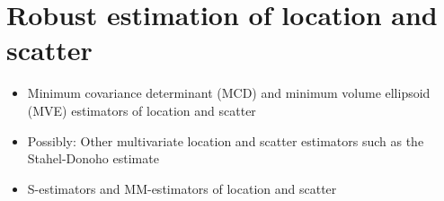 \chapter{Robust estimation of location and scatter}
\label{chap:mv}

\begin{itemize}
\item
    Minimum covariance determinant (MCD) and minimum volume ellipsoid (MVE) estimators of location and scatter
\item
    Possibly: Other multivariate location and scatter estimators such as the
    Stahel-Donoho estimate
\item
    S-estimators and MM-estimators of location and scatter
\end{itemize}


\endinput
